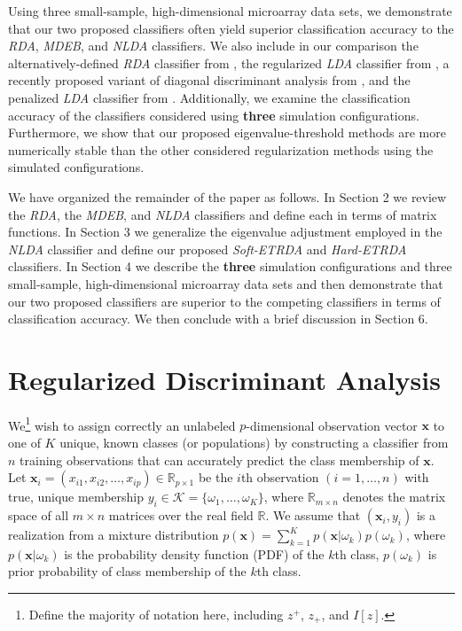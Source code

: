 \documentclass[11pt]{article}
\begin{document}
Using three small-sample, high-dimensional microarray data sets, we demonstrate that our two proposed classifiers often yield superior classification accuracy to the \emph{RDA}, \emph{MDEB}, and \emph{NLDA} classifiers. We also include in our comparison the alternatively-defined \emph{RDA} classifier from \cite*{Hastie:2008dt}, the regularized \emph{LDA} classifier from \cite{Guo:2007te}, a recently proposed variant of diagonal discriminant analysis from \cite*{Tong:2012hw}, and the penalized \emph{LDA} classifier from \cite{Witten:2011kc}. Additionally, we examine the classification accuracy of the classifiers considered using \textbf{three} simulation configurations. Furthermore, we show that our proposed eigenvalue-threshold methods are more numerically stable than the other considered regularization methods using the simulated configurations.

We have organized the remainder of the paper as follows. In Section 2 we review the \emph{RDA}, the \emph{MDEB}, and \emph{NLDA} classifiers and define each in terms of matrix functions. In Section 3 we generalize the eigenvalue adjustment employed in the \emph{NLDA} classifier and define our proposed \emph{Soft-ETRDA} and \emph{Hard-ETRDA} classifiers. In Section 4 we describe the \textbf{three} simulation configurations and three small-sample, high-dimensional microarray data sets and then demonstrate that our two proposed classifiers are superior to the competing classifiers in terms of classification accuracy. We then conclude with a brief discussion in Section 6.

\section{Regularized Discriminant Analysis}

We\footnote{Define the majority of notation here, including $z^+$, $z_+$, and $I[z]$.} wish to assign correctly an unlabeled $p$-dimensional observation vector $\bm x$ to one of $K$ unique, known classes (or populations) by constructing a classifier from $n$ training observations that can accurately predict the class membership of $\bm x$. Let $\bm x_i = (x_{i1}, x_{i2}, \ldots, x_{ip}) \in \mathbb{R}_{p \times 1}$ be the $i$th observation $(i = 1, \ldots, n)$ with true, unique membership $y_i \in \mathcal{K} = \{\omega_1, \ldots, \omega_K\}$, where $\mathbb{R}_{m \times n}$ denotes the matrix space of all $m \times n$ matrices over the real field $\mathbb{R}$. We assume that $(\bm x_i, y_i)$ is a realization from a mixture distribution $p(\bm x) = \sum_{k=1}^K p(\bm x | \omega_k) p(\omega_k)$, where $p(\bm x | \omega_k)$ is the probability density function (PDF) of the $k$th class, $p(\omega_k)$ is prior probability of class membership of the $k$th class.
\end{document}
